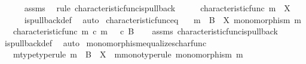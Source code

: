 \begin{isabellebody}
\ \ \ \ \isamarkupfalse%
\ assms\ \isamarkupfalse%
\ {\isacharparenleft}{\kern0pt}rule\ characteristic{\isacharunderscore}{\kern0pt}func{\isacharunderscore}{\kern0pt}is{\isacharunderscore}{\kern0pt}pullback{\isacharparenright}{\kern0pt}\isanewline
\ \ \isamarkupfalse%
\ \isamarkupfalse%
\ {\isachardoublequoteopen}characteristic{\isacharunderscore}{\kern0pt}func\ m\ {\isacharcolon}{\kern0pt}\ X\ {\isasymrightarrow}\ {\isasymOmega}{\isachardoublequoteclose}\isanewline
\ \ \ \ \isamarkupfalse%
\ is{\isacharunderscore}{\kern0pt}pullback{\isacharunderscore}{\kern0pt}def\ \isamarkupfalse%
\ auto\isanewline
{}\isamarkupfalse%
%
\endisatagproof
{\isafoldproof}%
%
\isadelimproof
\isanewline
%
\endisadelimproof
\isanewline
{}\isamarkupfalse%
\ characteristic{\isacharunderscore}{\kern0pt}func{\isacharunderscore}{\kern0pt}eq{\isacharcolon}{\kern0pt}\isanewline
\ \ \ {\isachardoublequoteopen}m\ {\isacharcolon}{\kern0pt}\ B\ {\isasymrightarrow}\ X{\isachardoublequoteclose}\ {\isachardoublequoteopen}monomorphism\ m{\isachardoublequoteclose}\isanewline
\ \ \ {\isachardoublequoteopen}characteristic{\isacharunderscore}{\kern0pt}func\ m\ {\isasymcirc}\isactrlsub c\ m\ {\isacharequal}{\kern0pt}\ {\isasymt}\ {\isasymcirc}\isactrlsub c\ {\isasymbeta}\isactrlbsub B\isactrlesub {\isachardoublequoteclose}\isanewline
%
\isadelimproof
\ \ %
\endisadelimproof
%
\isatagproof
{}\isamarkupfalse%
\ assms\ characteristic{\isacharunderscore}{\kern0pt}func{\isacharunderscore}{\kern0pt}is{\isacharunderscore}{\kern0pt}pullback\ \isamarkupfalse%
\ is{\isacharunderscore}{\kern0pt}pullback{\isacharunderscore}{\kern0pt}def\ \isamarkupfalse%
\ auto%
\endisatagproof
{\isafoldproof}%
%
\isadelimproof
\isanewline
%
\endisadelimproof
\isanewline
{}\isamarkupfalse%
\ monomorphism{\isacharunderscore}{\kern0pt}equalizes{\isacharunderscore}{\kern0pt}char{\isacharunderscore}{\kern0pt}func{\isacharcolon}{\kern0pt}\isanewline
\ \ \ m{\isacharunderscore}{\kern0pt}type{\isacharbrackleft}{\kern0pt}type{\isacharunderscore}{\kern0pt}rule{\isacharbrackright}{\kern0pt}{\isacharcolon}{\kern0pt}\ {\isachardoublequoteopen}m\ {\isacharcolon}{\kern0pt}\ B\ {\isasymrightarrow}\ X{\isachardoublequoteclose}\ \ m{\isacharunderscore}{\kern0pt}mono{\isacharbrackleft}{\kern0pt}type{\isacharunderscore}{\kern0pt}rule{\isacharbrackright}{\kern0pt}{\isacharcolon}{\kern0pt}\ {\isachardoublequoteopen}monomorphism\ m{\isachardoublequoteclose}\isanewline

\end{isabellebody}
